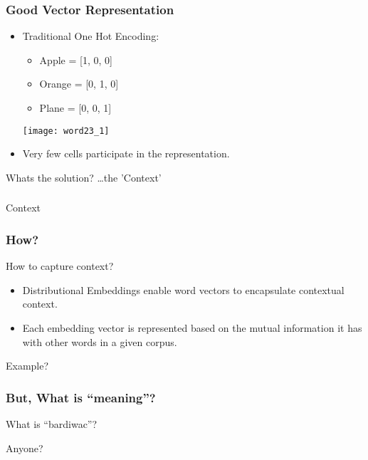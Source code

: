 \begin{frame}[fragile]\frametitle{Good Vector Representation}
\begin{itemize}
\item Traditional One Hot Encoding:
	\begin{itemize}
	\item Apple = [1, 0, 0]
	\item Orange = [0, 1, 0]
	\item Plane = [0, 0, 1]
	\end{itemize}
\begin{center}
\texttt{[image: word23\_1]}
\end{center}
\item Very few cells participate in the representation.
\end{itemize}

Whats the solution? \ldots the 'Context'
\end{frame}

\begin{frame}[fragile]\frametitle{}

\begin{center}
{\Large Context}
\end{center}
\end{frame}

\begin{frame}[fragile]\frametitle{How?}

How to capture context? 
\begin{itemize}
\item Distributional Embeddings enable word vectors to encapsulate contextual context. 
\item Each embedding vector is represented based on the mutual information it has with other words in a given corpus. 
\end{itemize}

Example?
\end{frame}




\begin{frame}[fragile]\frametitle{But, What is ``meaning''?}
What is ``bardiwac''?

Anyone?
\end{frame}

